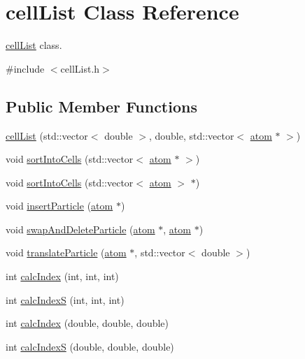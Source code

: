 \hypertarget{classcell_list}{\section{cell\-List Class Reference}
\label{classcell_list}
}


\hyperlink{classcell_list}{cell\-List} class.  




{\ttfamily \#include $<$cell\-List.\-h$>$}

\subsection*{Public Member Functions}
\begin{DoxyCompactItemize}
\item 
\hyperlink{classcell_list_abae34854b8fcdeaaf2dc8de2ee47de94}{cell\-List} (std\-::vector$<$ double $>$, double, std\-::vector$<$ \hyperlink{classatom}{atom} $\ast$ $>$)
\item 
void \hyperlink{classcell_list_a58c091eb874dd1b88558bb92424e5ef2}{sort\-Into\-Cells} (std\-::vector$<$ \hyperlink{classatom}{atom} $\ast$ $>$)
\item 
void \hyperlink{classcell_list_ac4400cd9b80c3199e6482e8bcb1990c6}{sort\-Into\-Cells} (std\-::vector$<$ \hyperlink{classatom}{atom} $>$ $\ast$)
\item 
void \hyperlink{classcell_list_a56c0012eed483e47248f9065bfc70fce}{insert\-Particle} (\hyperlink{classatom}{atom} $\ast$)
\item 
void \hyperlink{classcell_list_a31caca1e8dd05c33215ac7495d55aeea}{swap\-And\-Delete\-Particle} (\hyperlink{classatom}{atom} $\ast$, \hyperlink{classatom}{atom} $\ast$)
\item 
void \hyperlink{classcell_list_a0d77368abdd5a4665ca2302b9a20509b}{translate\-Particle} (\hyperlink{classatom}{atom} $\ast$, std\-::vector$<$ double $>$)
\item 
int \hyperlink{classcell_list_aa6b843131cd487164a137571c7343cab}{calc\-Index} (int, int, int)
\item 
int \hyperlink{classcell_list_a9a5f8f84d17a8f0f7d3791aa64b75803}{calc\-Index\-S} (int, int, int)
\item 
int \hyperlink{classcell_list_a01dbd9a86ec24293d369be8d67b9df70}{calc\-Index} (double, double, double)
\item 
int \hyperlink{classcell_list_a7df926ebf382f281d15935550ffcba64}{calc\-Index\-S} (double, double, double)
\end{DoxyCompactItemize}
